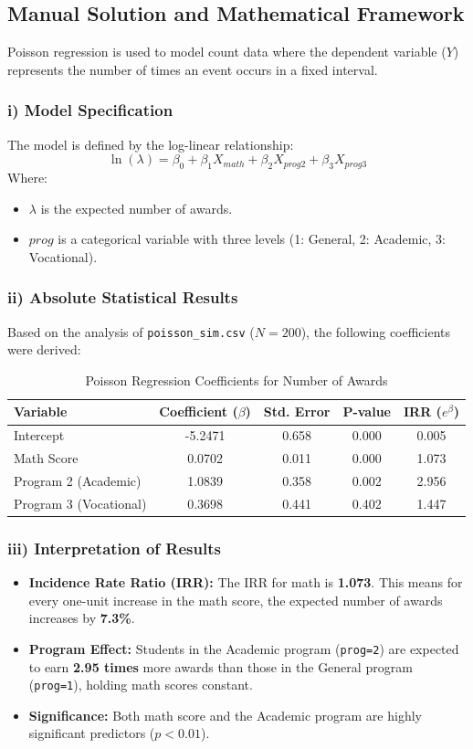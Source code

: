 \documentclass[12pt]{article}
\begin{document}
\subsection{Manual Solution and Mathematical Framework}
Poisson regression is used to model count data where the dependent variable ($Y$) represents the number of times an event occurs in a fixed interval.

\subsubsection{i) Model Specification}
The model is defined by the log-linear relationship:
\[ \ln(\lambda) = \beta_0 + \beta_1 X_{math} + \beta_2 X_{prog2} + \beta_3 X_{prog3} \]
Where:
\begin{itemize}
    \item $\lambda$ is the expected number of awards.
    \item $prog$ is a categorical variable with three levels (1: General, 2: Academic, 3: Vocational).
\end{itemize}

\subsubsection{ii) Absolute Statistical Results}
Based on the analysis of \texttt{poisson\_sim.csv} ($N=200$), the following coefficients were derived:

\begin{table}[h!]
\centering
\caption{Poisson Regression Coefficients for Number of Awards}
\begin{tabular}{@{}lcccc@{}}
\toprule
Variable & Coefficient ($\beta$) & Std. Error & P-value & IRR ($e^\beta$) \\ \midrule
Intercept & -5.2471 & 0.658 & 0.000 & 0.005 \\
Math Score & 0.0702 & 0.011 & 0.000 & 1.073 \\
Program 2 (Academic) & 1.0839 & 0.358 & 0.002 & 2.956 \\
Program 3 (Vocational) & 0.3698 & 0.441 & 0.402 & 1.447 \\ \bottomrule
\end{tabular}
\end{table}

\subsubsection{iii) Interpretation of Results}
\begin{itemize}
    \item \textbf{Incidence Rate Ratio (IRR):} The IRR for math is \textbf{1.073}. This means for every one-unit increase in the math score, the expected number of awards increases by \textbf{7.3\%}.
    \item \textbf{Program Effect:} Students in the Academic program (\texttt{prog=2}) are expected to earn \textbf{2.95 times} more awards than those in the General program (\texttt{prog=1}), holding math scores constant.
    \item \textbf{Significance:} Both math score and the Academic program are highly significant predictors ($p < 0.01$).
\end{itemize}
\end{document}
